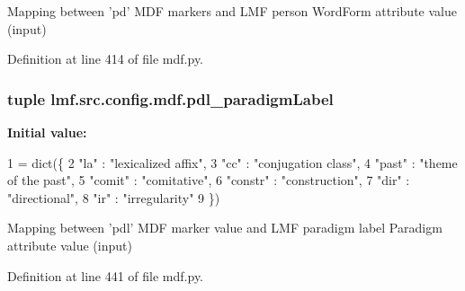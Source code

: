 Mapping between 'pd' M\+D\+F markers and L\+M\+F person Word\+Form attribute value (input) 



Definition at line 414 of file mdf.\+py.

\hypertarget{namespacelmf_1_1src_1_1config_1_1mdf_a8e61adc475ca415a33c85ef16c96d03d}{
\subsubsection[{pdl\+\_\+paradigm\+Label}]{\setlength{\rightskip}{0pt plus 5cm}tuple lmf.\+src.\+config.\+mdf.\+pdl\+\_\+paradigm\+Label}}\label{namespacelmf_1_1src_1_1config_1_1mdf_a8e61adc475ca415a33c85ef16c96d03d}
{\bfseries Initial value\+:}
\begin{DoxyCode}
1 = dict(\{
2     \textcolor{stringliteral}{"la"}        : \textcolor{stringliteral}{"lexicalized affix"},
3     \textcolor{stringliteral}{"cc"}        : \textcolor{stringliteral}{"conjugation class"},
4     \textcolor{stringliteral}{"past"}      : \textcolor{stringliteral}{"theme of the past"},
5     \textcolor{stringliteral}{"comit"}     : \textcolor{stringliteral}{"comitative"},
6     \textcolor{stringliteral}{"constr"}    : \textcolor{stringliteral}{"construction"},
7     \textcolor{stringliteral}{"dir"}       : \textcolor{stringliteral}{"directional"},
8     \textcolor{stringliteral}{"ir"}        : \textcolor{stringliteral}{"irregularity"}
9 \})
\end{DoxyCode}


Mapping between 'pdl' M\+D\+F marker value and L\+M\+F paradigm label Paradigm attribute value (input) 



Definition at line 441 of file mdf.\+py.

